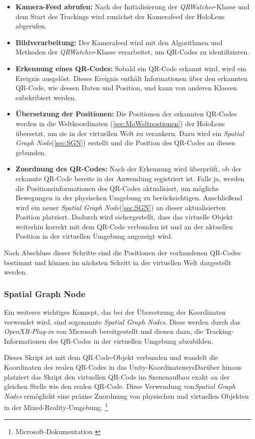 \begin{itemize}
\item \textbf{Kamera-Feed abrufen:} Nach der Initialisierung der \textit{QRWatcher}-Klasse und dem Start des Trackings wird zunächst der Kamerafeed der HoloLens abgerufen.
\item \textbf{Bildverarbeitung:} Der Kamerafeed wird mit den Algorithmen und Methoden der \textit{QRWatcher}-Klasse verarbeitet, um QR-Codes zu identifizieren.
\item \textbf{Erkennung eines QR-Codes:} Sobald ein QR-Code erkannt wird, wird ein Ereignis ausgelöst. Dieses Ereignis enthält Informationen über den erkannten QR-Code, wie dessen Daten und Position, und kann von anderen Klassen subskribiert werden.
\item \textbf{Übersetzung der Positionen:} Die Positionen der erkannten QR-Codes werden in die Weltkoordinaten (\ref{sec:MoWeltpostionen}) der HoloLens übersetzt, um sie in der virtuellen Welt zu verankern. Dazu wird ein \textit{Spatial Graph Node}(\ref{sec:SGN}) erstellt und die Position des QR-Codes an diesen gebunden.
\item \textbf{Zuordnung des QR-Codes:} Nach der Erkennung wird überprüft, ob der erkannte QR-Code bereits in der Anwendung registriert ist. Falls ja, werden die Positionsinformationen des QR-Codes aktualisiert, um mögliche Bewegungen in der physischen Umgebung zu berücksichtigen. Anschließend wird ein neuer \textit{Spatial Graph Node}(\ref{sec:SGN}) an dieser aktualisierten Position platziert. Dadurch wird sichergestellt, dass das virtuelle Objekt weiterhin korrekt mit dem QR-Code verbunden ist und an der aktuellen Position in der virtuellen Umgebung angezeigt wird.
\end{itemize}

Nach Abschluss dieser Schritte sind die Positionen der vorhandenen QR-Codes bestimmt und können im nächsten Schritt in der virtuellen Welt dargestellt werden.

\subsubsection{\label{sec:SGN} Spatial Graph Node}
Ein weiteres wichtiges Konzept, das bei der Übersetzung der Koordinaten verwendet wird, sind sogenannte \textit{Spatial Graph Nodes}. Diese werden durch das \textit{OpenXR-Plug-in} von Microsoft bereitgestellt und dienen dazu, die Tracking-Informationen des QR-Codes in der virtuellen Umgebung abzubilden.

Dieses Skript ist mit dem QR-Code-Objekt verbunden und wandelt die Koordinaten des realen QR-Codes in das Unity-KoordinatensysDarüber hinaus platziert das Skript den virtuellen QR-Code im Szenenaufbau exakt an der gleichen Stelle wie den realen QR-Code. Diese Verwendung von\textit{Spatial Graph Nodes} ermöglicht eine präzise Zuordnung von physischen und virtuellen Objekten in
der Mixed-Reality-Umgebung. \footnote{Microsoft-Dokumentation \cite{Spatial Graph Node}}

